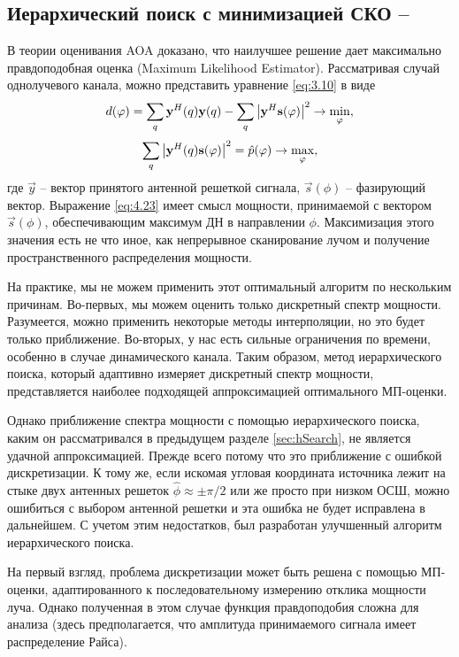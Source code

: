 \subsection[Иерархический поиск с минимизацией СКО]{Иерархический поиск с минимизацией СКО -- \hSearchMMSE{}}
\label{sec:hSearchMMSE:singlepath}
В теории оценивания AOA доказано, что наилучшее решение дает максимально правдоподобная оценка (Maximum Likelihood Estimator).
Рассматривая случай однолучевого канала, можно представить уравнение \eqref{eq:3.10} в виде
\begin{equation}
    d(\phi) = \sum\limits_q \vec y^H(q) \vec y(q) - \sum\limits_q\abs{\vec y^H \vec s(\phi)}^2 \to \min_\phi,
\end{equation}
\begin{equation}
    \label{eq:4.23}
    \sum\limits_q \abs{\vec y^H(q) \vec s(\phi)}^2 = \hat p(\phi) \to \max_\phi,
\end{equation}
где $\vec y$ -- вектор принятого антенной решеткой сигнала, $\vec s(\phi)$ --
фазирующий вектор. Выражение \eqref{eq:4.23} имеет смысл мощности,
принимаемой с  вектором $\vec s(\phi)$, обеспечивающим максимум ДН в направлении
$\phi$. Максимизация этого значения есть не что иное, как непрерывное
сканирование лучом и получение пространственного распределения мощности.

На практике, мы не можем применить этот оптимальный алгоритм по нескольким
причинам. Во-первых, мы  можем оценить только дискретный спектр мощности.
Разумеется, можно применить некоторые методы интерполяции, но это будет только
приближение.  Во-вторых, у нас есть сильные ограничения по времени, особенно в
случае динамического канала.  Таким образом, метод иерархического поиска,
который адаптивно измеряет дискретный спектр мощности, представляется наиболее
подходящей аппроксимацией оптимального МП-оценки.

Однако приближение спектра мощности с помощью иерархического
поиска, каким он рассматривался в предыдущем разделе \eqref{sec:hSearch}, не
является удачной аппроксимацией.  Прежде всего потому что это приближение с
ошибкой дискретизации. К тому же, если искомая угловая координата источника
лежит на стыке  двух антенных решеток $\hat \phi \approx \pm \pi/2$ или же просто
при низком ОСШ,  можно ошибиться с выбором антенной решетки и эта ошибка не
будет исправлена в дальнейшем. С учетом этим недостатков, был разработан
улучшенный алгоритм иерархического поиска.

На первый взгляд, проблема дискретизации может быть решена с помощью
МП-оценки, адаптированного к последовательному измерению отклика мощности
луча. Однако полученная в этом случае функция правдоподобия сложна для анализа
(здесь предполагается, что амплитуда принимаемого сигнала имеет распределение
Райса).


